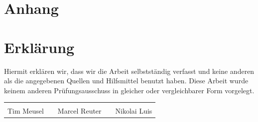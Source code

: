 
\printglossaries%

\printbibliography[heading=bibnumbered]

\chapter{Anhang}


\FloatBarrier%

\FloatBarrier%


\chapter{Erklärung}
Hiermit erklären wir, dass wir die Arbeit selbstständig verfasst und keine
anderen als die angegebenen Quellen und Hilfsmittel benutzt haben. Diese Arbeit
wurde keinem anderen Prüfungsausschuss in gleicher oder vergleichbarer Form
vorgelegt.

\vspace{10ex}
{\centering
\renewcommand{\arraystretch}{0.9}
\begin{tabular}{p{}p{}p{}p{}p{}}
  \dotfill                    & & \dotfill                      & & \dotfill \\
  \centering\footnotesize{Tim Meusel}& & \centering\footnotesize{Marcel Reuter}& & \centering\footnotesize{Nikolai Luis}%
\end{tabular}
}


